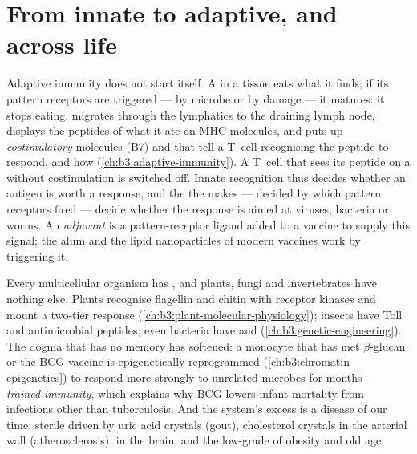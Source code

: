 \section{From innate to adaptive, and across life}

\begin{proposition}\label{prop:b3:innate-immunity:bridge}
Adaptive immunity does not start itself. A \emph{} in a
tissue eats what it finds; if its pattern receptors are triggered ---
by microbe or by damage --- it matures: it stops eating, migrates
through the lymphatics to the draining lymph node, displays the
peptides of what it ate on MHC molecules, and puts up
\emph{costimulatory} molecules (B7) and  that tell a T~cell
recognising the peptide to respond, and how (\cref{ch:b3:adaptive-immunity}).
A T~cell that sees its peptide on a  without
costimulation is switched off. Innate recognition thus decides whether
an antigen is worth a response, and the  the 
makes --- decided by which pattern receptors fired --- decide whether
the response is aimed at viruses, bacteria or worms. An
\emph{adjuvant} is a pattern-receptor ligand added to a vaccine to
supply this signal; the alum and the lipid nanoparticles of modern
vaccines work by triggering it.
\end{proposition}

\begin{remark}\label{rem:b3:innate-immunity:everywhere}
Every multicellular organism has , and plants, fungi
and invertebrates have nothing else. Plants recognise flagellin and
chitin with receptor kinases and mount a two-tier response
(\cref{ch:b3:plant-molecular-physiology}); insects have Toll and
antimicrobial peptides; even bacteria have  and
 (\cref{ch:b3:genetic-engineering}). The dogma that  has no memory has softened: a monocyte that has met
$\beta$-glucan or the BCG vaccine is epigenetically reprogrammed
(\cref{ch:b3:chromatin-epigenetics}) to respond more strongly to
unrelated microbes for months --- \emph{trained immunity}, which
explains why BCG lowers infant mortality from infections other than
tuberculosis. And the system's excess is a disease of our time:
sterile  driven by uric acid crystals (gout), cholesterol
crystals in the arterial wall (atherosclerosis),  in the brain,
and the low-grade  of obesity and old age.
\end{remark}

